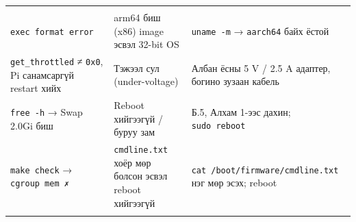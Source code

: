 \begin{longtable}[]{@{}lll@{}}
\begin{minipage}[t]{0.30\columnwidth}
\end{minipage}\tabularnewline
\begin{minipage}[t]{0.30\columnwidth}\raggedright
\texttt{exec\ format\ error}\strut
\end{minipage} & \begin{minipage}[t]{0.30\columnwidth}\raggedright
arm64 биш (x86) image эсвэл 32-bit OS\strut
\end{minipage} & \begin{minipage}[t]{0.30\columnwidth}\raggedright
\texttt{uname\ -m} → \texttt{aarch64} байх ёстой\strut
\end{minipage}\tabularnewline
\begin{minipage}[t]{0.30\columnwidth}\raggedright
\texttt{get\_throttled} ≠ \texttt{0x0}, Pi санамсаргүй restart хийх\strut
\end{minipage} & \begin{minipage}[t]{0.30\columnwidth}\raggedright
Тэжээл сул (under-voltage)\strut
\end{minipage} & \begin{minipage}[t]{0.30\columnwidth}\raggedright
Албан ёсны 5 V / 2.5 A адаптер, богино зузаан кабель\strut
\end{minipage}\tabularnewline
\begin{minipage}[t]{0.30\columnwidth}\raggedright
\texttt{free\ -h} → Swap 2.0Gi биш\strut
\end{minipage} & \begin{minipage}[t]{0.30\columnwidth}\raggedright
Reboot хийгээгүй / буруу зам\strut
\end{minipage} & \begin{minipage}[t]{0.30\columnwidth}\raggedright
Б.5, Алхам 1-ээс дахин; \texttt{sudo\ reboot}\strut
\end{minipage}\tabularnewline
\begin{minipage}[t]{0.30\columnwidth}\raggedright
\texttt{make\ check} → \texttt{cgroup\ mem\ ✗}\strut
\end{minipage} & \begin{minipage}[t]{0.30\columnwidth}\raggedright
\texttt{cmdline.txt} хоёр мөр болсон эсвэл reboot хийгээгүй\strut
\end{minipage} & \begin{minipage}[t]{0.30\columnwidth}\raggedright
\texttt{cat\ /\allowbreak{}boot/\allowbreak{}firmware/\allowbreak{}cmdline.\allowbreak{}txt} нэг мөр эсэх; reboot\strut
\end{minipage}\tabularnewline
\begin{minipage}[t]{0.30\columnwidth}\raggedright

\end{minipage}
\end{longtable}
